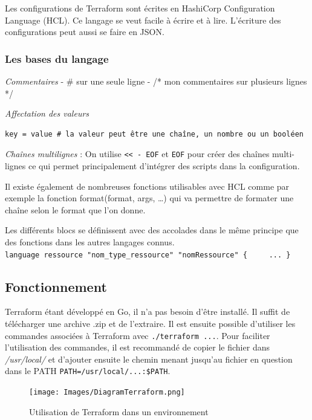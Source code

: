 \documentclass[]{article}
\begin{document}
Les configurations de Terraform sont écrites en HashiCorp Configuration
Language (HCL). Ce langage se veut facile à écrire et à lire. L'écriture
des configurations peut aussi se faire en JSON.

\subsubsection{Les bases du langage}\label{les-bases-du-langage}

\emph{Commentaires} - \# sur une seule ligne - /* mon commentaires sur
plusieurs lignes */

\emph{Affectation des valeurs}

\begin{verbatim}
key = value # la valeur peut être une chaîne, un nombre ou un booléen
\end{verbatim}

\emph{Chaînes multilignes} : On utilise
\texttt{\textless{}\textless{}\ -\ EOF} et \texttt{EOF} pour créer des
chaînes multi-lignes ce qui permet principalement d'intégrer des scripts
dans la configuration.

Il existe également de nombreuses fonctions utilisables avec HCL comme
par exemple la fonction format(format, args, \ldots{}) qui va permettre
de formater une chaîne selon le format que l'on donne.

Les différents blocs se définissent avec des accolades dans le même
principe que des fonctions dans les autres langages connus.
\texttt{language\ ressource\ "nom\_type\_ressource"\ "nomRessource"\ \{\ \ \ \ \ ...\ \}}

\subsection{Fonctionnement}\label{fonctionnement}

Terraform étant développé en Go, il n'a pas besoin d'être installé. Il
suffit de télécharger une archive .zip et de l'extraire. Il est ensuite
possible d'utiliser les commandes associées à Terraform avec
\texttt{./terraform\ ...}. Pour faciliter l'utilisation des commandes,
il est recommandé de copier le fichier dans \emph{/usr/local/} et
d'ajouter ensuite le chemin menant jusqu'au fichier en question dans le
PATH \texttt{PATH=/usr/local/...:\$PATH}.

\begin{figure}
\centering
\texttt{[image: Images/DiagramTerraform.png]}
\caption{Utilisation de Terraform dans un environnement}
\end{figure}
\end{document}
